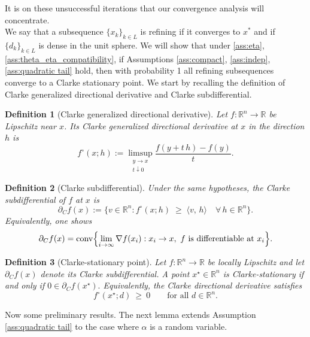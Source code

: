 \documentclass[11pt,a4paper]{article}
\newtheorem{definition}{Definition}[section]
\newcommand{\Dexp}{p}
\begin{document}
It is on these unsuccessful iterations that our convergence analysis will concentrate.\\
We say that a subsequence $\{x_k\}_{k \in L}$ is refining if it converges to $x^*$ and if $\{d_k\}_{k \in L}$ is dense in the unit sphere. We will show that under \eqref{ass:eta}, \eqref{ass:theta_eta_compatibility}, if Assumptions  \ref{ass:compact}, \ref{ass:indep}, \ref{ass:quadratic tail} hold, then with probability 1 all refining subsequences converge to a Clarke stationary point. We start by recalling the definition of Clarke generalized directional derivative  and Clarke subdifferential.
\begin{definition}[Clarke generalized directional derivative]
Let $f:\mathbb{R}^n\to\mathbb{R}$ be Lipschitz near $x$.  Its \emph{Clarke generalized directional derivative} at $x$ in the direction $h$ is
\[
  f^\circ(x;h)
  :=
  \limsup_{\substack{y\to x\\t\downarrow0}}
    \frac{f(y + t\,h) - f(y)}{t}.
\]
\end{definition}
\begin{definition}[Clarke subdifferential]
Under the same hypotheses, the \emph{Clarke subdifferential} of $f$ at $x$ is
\[
  \partial_C f(x)
  := \bigl\{v\in\mathbb{R}^n : f^\circ(x;h)\;\ge\;\langle v,\,h\rangle
    \quad\forall\,h\in\mathbb{R}^n\bigr\}.
\]
Equivalently, one shows
\[
  \partial_C f(x)
  = \mathrm{conv}\Bigl\{
      \lim_{i\to\infty}\nabla f(x_i):
      x_i\to x,\ f\text{ is differentiable at }x_i
    \Bigr\}.
\]
\end{definition}
\begin{definition}[Clarke-stationary point]\label{def:clarke-stationary}
Let $f:\mathbb{R}^n\to\mathbb{R}$ be locally Lipschitz and let $\partial_{C} f(x)$ denote its
Clarke subdifferential. A point $x^\star\in\mathbb{R}^n$ is \emph{Clarke-stationary} if and only if $0 \in \partial_{C} f(x^\star).$
Equivalently, the Clarke directional derivative satisfies
\[
f^{\circ}(x^\star; d)\ \ge\ 0 \qquad \text{for all } d\in\mathbb{R}^n.
\]
\end{definition}
Now some preliminary results. The next lemma extends Assumption \ref{ass:quadratic tail} to the case where $\alpha$ is a random variable.
\end{document}
